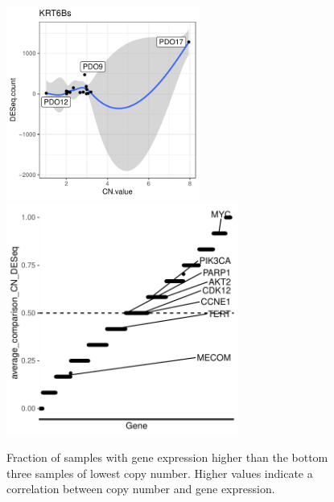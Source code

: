 \documentclass{article}
\begin{document}
\begin{figure}[h]
\includegraphics[width=2.5in]{../../RNASeq_and_CN/figures/example_KRT6B.pdf}
\includegraphics[width=3in]{../../RNASeq_and_CN/figures/average_bottomCN_DESeq.pdf}
\caption{Fraction of samples with gene expression higher than the bottom three samples of lowest copy number. Higher values indicate a correlation between copy number and gene expression.\label{cn_ge_specific_genes}}
\end{figure}
\end{document}
